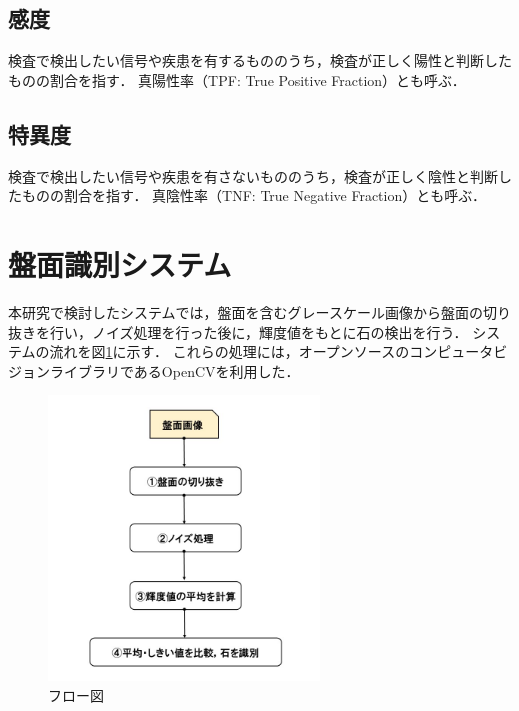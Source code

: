 \documentclass[openright]{nitocs}
\numberwithin{equation}{section}
\begin{document}
        \subsection{感度} %
        検査で検出したい信号や疾患を有するもののうち，検査が正しく陽性と判断したものの割合を指す．
        真陽性率（TPF: True Positive Fraction）とも呼ぶ．

        \subsection{特異度} %
        検査で検出したい信号や疾患を有さないもののうち，検査が正しく陰性と判断したものの割合を指す．
        真陰性率（TNF: True Negative Fraction）とも呼ぶ．

    \section{盤面識別システム} %
        本研究で検討したシステムでは，盤面を含むグレースケール画像から盤面の切り抜きを行い，ノイズ処理を行った後に，輝度値をもとに石の検出を行う．
        システムの流れを図\ref{flow}に示す．
        これらの処理には，オープンソースのコンピュータビジョンライブラリであるOpenCV\cite{opencv}を利用した．
        \begin{figure} %
            \begin{center}
            \includegraphics[width=72mm,height=75.6mm]{flow.jpg}
            \caption{フロー図}
            \label{flow}
            \end{center}
        \end{figure}
\end{document}
